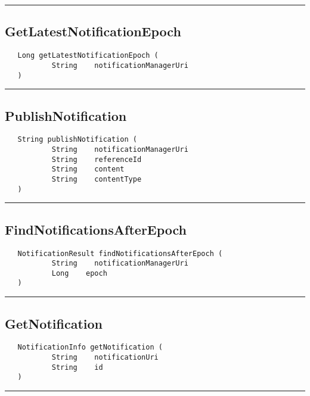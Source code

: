 \rule{15cm}{2pt}
\subsection{GetLatestNotificationEpoch}
\label{Api:GetLatestNotificationEpoch}
\begin{verbatim}
   Long getLatestNotificationEpoch (
           String    notificationManagerUri
   )
\end{verbatim}



\rule{15cm}{2pt}
\subsection{PublishNotification}
\label{Api:PublishNotification}
\begin{verbatim}
   String publishNotification (
           String    notificationManagerUri
           String    referenceId
           String    content
           String    contentType
   )
\end{verbatim}



\rule{15cm}{2pt}
\subsection{FindNotificationsAfterEpoch}
\label{Api:FindNotificationsAfterEpoch}
\begin{verbatim}
   NotificationResult findNotificationsAfterEpoch (
           String    notificationManagerUri
           Long    epoch
   )
\end{verbatim}



\rule{15cm}{2pt}
\subsection{GetNotification}
\label{Api:GetNotification}
\begin{verbatim}
   NotificationInfo getNotification (
           String    notificationUri
           String    id
   )
\end{verbatim}



\rule{15cm}{2pt}
